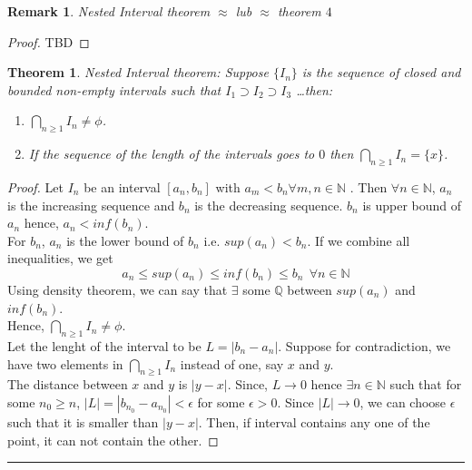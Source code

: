 \documentclass[12pt]{report}
\newtheorem{thm}{Theorem}
\newtheorem*{rem}{Remark}
\begin{document}
\begin{rem}
    Nested Interval theorem $\approx$ lub $\approx$ theorem $4$
\end{rem}
\begin{proof}
    TBD
\end{proof}
\begin{thm}
    Nested Interval theorem: Suppose $\{I_n\}$ is the sequence of closed and bounded non-empty intervals such that $I_1 \supset I_2 \supset I_3$ \dots then:
    \begin{enumerate}
        \item $\bigcap\limits_{n \geq 1} I_n \neq \phi$.
        \item If the sequence of the length of the intervals goes to $0$ then $\bigcap\limits_{n \geq 1} I_n = \{x\}$. 
    \end{enumerate}
\end{thm}

\begin{proof}
    Let $I_n$ be an interval $[a_n, b_n]$ with $a_m < b_n \forall m,n \in \mathbb{N}$ . Then $\forall n \in \mathbb{N}$, $a_n$ is the increasing sequence and $b_n$ is the decreasing sequence. $b_n$ is upper bound of $a_n$ hence, $a_n < inf(b_n)$.\\
    For $b_n$, $a_n$ is the lower bound of $b_n$ i.e. $sup(a_n)< b_n$. If we combine all inequalities, we get 
    $$ a_n \leq sup(a_n) \leq inf(b_n) \leq b_n ~~ \forall n \in \mathbb{N}$$
    Using density theorem, we can say that $\exists$ some $\mathbb{Q}$ between $sup(a_n)$ and $inf(b_n)$.\\
    Hence, $\bigcap\limits_{n \geq 1} I_n \neq \phi$.\\
    Let the lenght of the interval to be $L = |b_n - a_n|$. Suppose for contradiction, we have two elements in $\bigcap\limits_{n\geq 1}I_n$ instead of one, say $x$ and $y$. \\ The distance between $x$ and $y$ is $|y - x|$. Since, $L \to 0$ hence $\exists n \in \mathbb{N}$ such that for some $n_0 \geq n$, $|L| = |b_{n_0} - a_{n_0}|< \epsilon$ for some $\epsilon > 0$. Since $|L| \to 0$, we can choose $\epsilon$ such that it is smaller than $|y - x|$. Then, if interval contains any one of the point, it can not contain the other.
\end{proof}

\hrule
\end{document}
